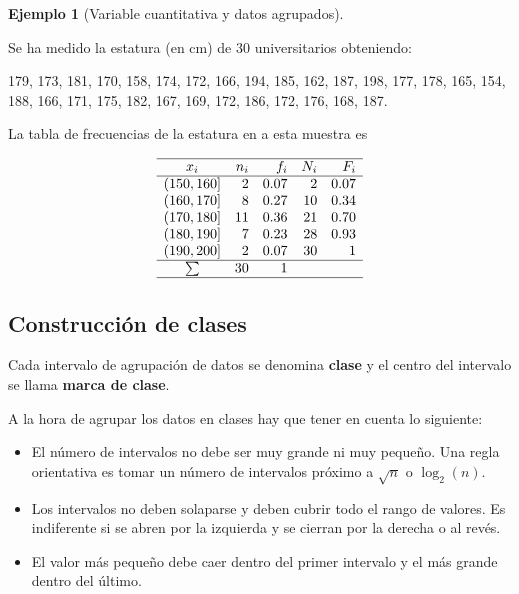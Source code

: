 \documentclass[
  a4paper,
]{scrreport}
\providecommand{\tightlist}{%
  \setlength{\itemsep}{0pt}\setlength{\parskip}{0pt}}\usepackage{longtable,booktabs,array}
\theoremstyle{definition}
\theoremstyle{definition}
\newtheorem{example}{Ejemplo}[chapter]
\theoremstyle{plain}
\theoremstyle{remark}
\begin{document}
\begin{example}[Variable cuantitativa y datos
agrupados]\protect\hypertarget{exm-tabla-frecuencias-datos-agrupados}{}\label{exm-tabla-frecuencias-datos-agrupados}

Se ha medido la estatura (en cm) de 30 universitarios obteniendo:

179, 173, 181, 170, 158, 174, 172, 166, 194, 185, 162, 187, 198, 177,
178, 165, 154, 188, 166, 171, 175, 182, 167, 169, 172, 186, 172, 176,
168, 187.

La tabla de frecuencias de la estatura en a esta muestra es

\[ 
\begin{array}{crrrr}
\hline
x_i & n_i & f_i & N_i & F_i\\
\hline
(150,160] & 2 & 0.07 & 2 & 0.07\\
(160,170] & 8 & 0.27 & 10 & 0.34\\
(170,180] & 11 & 0.36 & 21 & 0.70\\
(180,190] & 7 & 0.23 & 28 & 0.93\\
(190,200] & 2 & 0.07 & 30 & 1 \\
\hline
\sum & 30 & 1 \\
\hline
\end{array}
\]

\end{example}

\hypertarget{construcciuxf3n-de-clases}{%
\subsection{Construcción de clases}\label{construcciuxf3n-de-clases}}

Cada intervalo de agrupación de datos se denomina \textbf{clase} y el
centro del intervalo se llama \textbf{marca de clase}.

A la hora de agrupar los datos en clases hay que tener en cuenta lo
siguiente:

\begin{itemize}
\tightlist
\item
  El número de intervalos no debe ser muy grande ni muy pequeño. Una
  regla orientativa es tomar un número de intervalos próximo a
  \(\sqrt{n}\) o \(\log_2(n)\).
\item
  Los intervalos no deben solaparse y deben cubrir todo el rango de
  valores. Es indiferente si se abren por la izquierda y se cierran por
  la derecha o al revés.
\item
  El valor más pequeño debe caer dentro del primer intervalo y el más
  grande dentro del último.
\end{itemize}
\end{document}
